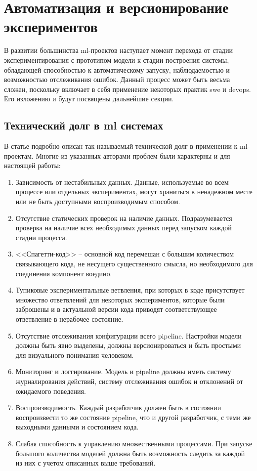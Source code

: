 
\chapter{Автоматизация и версионирование экспериментов}
В развитии большинства \acrshort{ml}-проектов наступает момент перехода от стадии экспериментирования с прототипом модели к стадии построения системы, обладающей способностью к автоматическому запуску, наблюдаемостью и возможностью отслеживания ошибок. 
Данный процесс может быть весьма сложен, поскольку включает в себя применение некоторых практик \gls{swe} и \gls{devops}.
Его изложению и будут посвящены дальнейшие секции.
\section{Технический долг в \acrshort{ml} системах}
\label{sec:ml-debt}
В статье \cite{cite:ml-debt} подробно описан так называемый технической долг в применении к \acrshort{ml}-проектам.
Многие из указанных авторами проблем были характерны и для настоящей работы:
\begin{enumerate}
    \item Зависимость от нестабильных данных.
        Данные, используемые во всем процессе или отдельных экспериментах, могут храниться в ненадежном месте или не быть доступными воспроизводимым способом.
    \item Отсутствие статических проверок на наличие данных.
        Подразумевается проверка на наличие всех необходимых данных перед запуском каждой стадии процесса.
    \item <<Спагетти-код>> -- основной код перемешан с большим количеством связывающего кода, не несущего существенного смысла, но необходимого для соединения компонент воедино.
    \item Тупиковые экспериментальные ветвления, при которых в коде присутствует множество ответвлений для некоторых экспериментов, которые были заброшены и в актуальной версии кода приводят соответствующее ответвление в нерабочее состояние.
    \item Отсутствие отслеживания конфигурации всего \gls{pipeline}.
    Настройки модели должны быть явно выделены, должны версионироваться и быть простыми для визуального понимания человеком.
    \item Мониторинг и логгирование.
        Модель и \gls{pipeline} должны иметь систему журналирования действий, систему отслеживания ошибок и отклонений от ожидаемого поведения.
    \item Воспроизводимость.
        Каждый разработчик должен быть в состоянии воспроизвести то же состояние \gls{pipeline}, что и другой разработчик, с теми же выходными данными и состоянием кода.
    \item Слабая способность к управлению множественными процессами.
        При запуске большого количества моделей должна быть возможность следить за каждой из них с учетом описанных выше требований.
\end{enumerate}

